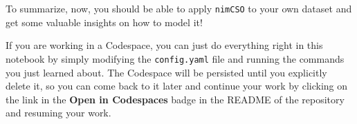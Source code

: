 \label{nimcsotutorial:summary}

To summarize, now, you should be able to apply \texttt{nimCSO} to
your own dataset and get some valuable insights on how to model it!

If you are working in a Codespace, you can just do everything right in
this notebook by simply modifying the
\texttt{config.yaml} file and running the commands you
just learned about. The Codespace will be persisted until you explicitly
delete it, so you can come back to it later and continue your work by
clicking on the link in the \textbf{Open in Codespaces} badge in the README
of the repository and resuming your work.

